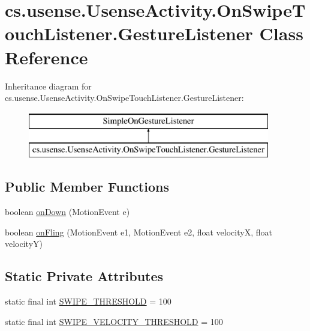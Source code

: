 \hypertarget{classcs_1_1usense_1_1_usense_activity_1_1_on_swipe_touch_listener_1_1_gesture_listener}{}\section{cs.\+usense.\+Usense\+Activity.\+On\+Swipe\+Touch\+Listener.\+Gesture\+Listener Class Reference}
\label{classcs_1_1usense_1_1_usense_activity_1_1_on_swipe_touch_listener_1_1_gesture_listener}
Inheritance diagram for cs.\+usense.\+Usense\+Activity.\+On\+Swipe\+Touch\+Listener.\+Gesture\+Listener\+:\begin{figure}[H]
\begin{center}
\leavevmode
\includegraphics[height=2.000000cm]{classcs_1_1usense_1_1_usense_activity_1_1_on_swipe_touch_listener_1_1_gesture_listener}
\end{center}
\end{figure}
\subsection*{Public Member Functions}
\begin{DoxyCompactItemize}
\item 
boolean \hyperlink{classcs_1_1usense_1_1_usense_activity_1_1_on_swipe_touch_listener_1_1_gesture_listener_a07cc41778470d35e2690465ef0c80204}{on\+Down} (Motion\+Event e)
\item 
boolean \hyperlink{classcs_1_1usense_1_1_usense_activity_1_1_on_swipe_touch_listener_1_1_gesture_listener_ac5158a2e69c859ac9fe69819e096ce65}{on\+Fling} (Motion\+Event e1, Motion\+Event e2, float velocity\+X, float velocity\+Y)
\end{DoxyCompactItemize}
\subsection*{Static Private Attributes}
\begin{DoxyCompactItemize}
\item 
static final int \hyperlink{classcs_1_1usense_1_1_usense_activity_1_1_on_swipe_touch_listener_1_1_gesture_listener_a7f7b638d56d47102334fd6f01fa6126e}{S\+W\+I\+P\+E\+\_\+\+T\+H\+R\+E\+S\+H\+O\+L\+D} = 100
\item 
static final int \hyperlink{classcs_1_1usense_1_1_usense_activity_1_1_on_swipe_touch_listener_1_1_gesture_listener_a9686de157c3282b666897c7eda272aa6}{S\+W\+I\+P\+E\+\_\+\+V\+E\+L\+O\+C\+I\+T\+Y\+\_\+\+T\+H\+R\+E\+S\+H\+O\+L\+D} = 100
\end{DoxyCompactItemize}


